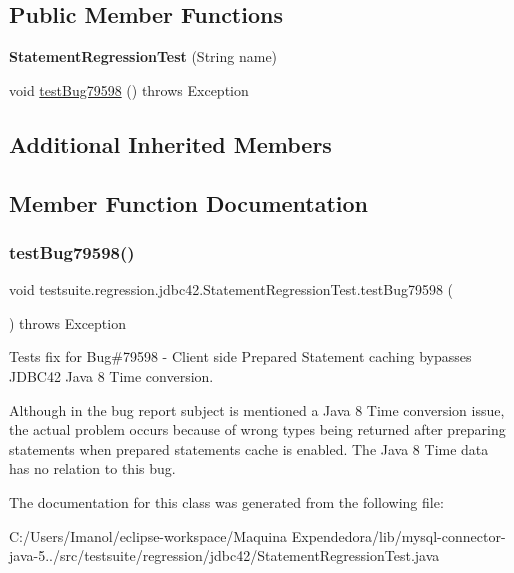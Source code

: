 \subsection*{Public Member Functions}
\begin{DoxyCompactItemize}
\item 
\mbox{\label{classtestsuite_1_1regression_1_1jdbc42_1_1_statement_regression_test_a4dc2c37af6ff37a9d241956285280ab8}} 
{\bfseries Statement\+Regression\+Test} (String name)
\item 
void \mbox{\hyperlink{classtestsuite_1_1regression_1_1jdbc42_1_1_statement_regression_test_a26436c1550ec062ed6a7c11ee2fe5047}{test\+Bug79598}} ()  throws Exception 
\end{DoxyCompactItemize}
\subsection*{Additional Inherited Members}


\subsection{Member Function Documentation}
\mbox{\label{classtestsuite_1_1regression_1_1jdbc42_1_1_statement_regression_test_a26436c1550ec062ed6a7c11ee2fe5047}} 
\subsubsection{\texorpdfstring{test\+Bug79598()}{testBug79598()}}
{\footnotesize\ttfamily void testsuite.\+regression.\+jdbc42.\+Statement\+Regression\+Test.\+test\+Bug79598 (\begin{DoxyParamCaption}{ }\end{DoxyParamCaption}) throws Exception}

Tests fix for Bug\#79598 -\/ Client side Prepared Statement caching bypasses J\+D\+B\+C42 Java 8 Time conversion.

Although in the bug report subject is mentioned a Java 8 Time conversion issue, the actual problem occurs because of wrong types being returned after preparing statements when prepared statements cache is enabled. The Java 8 Time data has no relation to this bug. 

The documentation for this class was generated from the following file\+:\begin{DoxyCompactItemize}
\item 
C\+:/\+Users/\+Imanol/eclipse-\/workspace/\+Maquina Expendedora/lib/mysql-\/connector-\/java-\/5../src/testsuite/regression/jdbc42/Statement\+Regression\+Test.\+java\end{DoxyCompactItemize}
